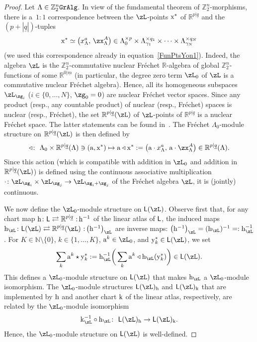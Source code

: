 \documentclass[pdftex]{sigma}%
\newcommand{\catname}[1]{\textnormal{\texttt{#1}}}
\newcommand{\R}{{\mathbb R}}
\newcommand{\Z}{{\mathbb Z}}
\def\ul{\underline}
\def\ul{\underline}
\newcommand{\0}{\otimes}
\newcommand{\z}{\Z_2^n}
\numberwithin{equation}{section}
\begin{document}
\begin{proof}
Let $\Lambda \in \Z_2^n\catname{GrAlg}$. In view of the fundamental theorem of $\z$-morphisms, there is a~$1:1$ correspondence between the $\zL$-points $\rm{x}^*$ of $\R^{p|\ul{q}}$ and the $(p+|\ul{q}|)$-tuples
%
\[
\mathrm{x}^* \simeq \big( {x}^a_\Lambda , \, \zx^A_\Lambda\big)\in {\Lambda}_{0}^{\times p} \times \Lambda_{\gamma_1}^{\times q_1} \times \dots \times \Lambda_{\gamma_N}^{\times q_N}
\]
%
(we used this correspondence already in equation~\eqref{FunPtsYon1}). Indeed, the algebra $\zL$ is the $\Z_2^n$-commutative nuclear Fr\'echet $\R$-algebra of global $\Z_2^n$-functions of some $\R^{0|\ul{m}}$ (in particular, the degree zero term $\zL_0$ of $\zL$ is a commutative nuclear Fr\'echet algebra). Hence, all its homogeneous subspaces $\zL_{\zg_i}$ ($i\in\{0,\dots, N\}$, $\zg_0=0$) are nuclear Fr\'echet vector spaces. Since any product (resp., any countable product) of nuclear (resp., Fr\'echet) spaces is nuclear (resp., Fr\'echet), the set $\R^{p|\ul{q}}(\zL)$ of $\zL$-points of $\R^{p|\ul{q}}$ is a nuclear Fr\'echet space. The latter statements can be found in~\cite{Bruce:2018}. The Fr\'{e}chet $\Lambda_{0}$-module structure on $\R^{p|\ul{q}}(\zL)$ is then defined by
\begin{gather}\label{ActionCompWise}
 \triangleleft\colon\ \Lambda_{0} \times \R^{p|\ul{q}}(\Lambda)\ni (\mathrm{a}, \mathrm{x}^*)\mapsto {\rm a}\triangleleft{\rm x}^*:=\big(\mathrm{a} \cdot x_\Lambda^a, \, \mathrm{a} \cdot \zx_\Lambda^{A} \big)\in\R^{p|\ul{q}}(\Lambda) .
\end{gather}
Since this action (which is compatible with addition in $\zL_0$ and addition in $\R^{p|\ul q}(\zL)$) is defined using the continuous associative multiplication $\cdot\colon \zL_{\zg_i}\times\zL_{\zg_j}\to\zL_{\zg_i+\zg_j}$ of the Fr\'echet algebra $\zL$, it is (jointly) continuous.

We now define the $\zL_0$-module structure on ${\sf L}(\zL)$. Observe first that, for any chart map ${\rm h}\colon {\sf L}\rightleftarrows\R^{p|\ul q}\ {:}\, {\rm h}^{-1}$ of the linear atlas of $\sf L$, the induced maps ${\rm h}_\zL\colon {\sf L}(\zL)\rightleftarrows\R^{p|\ul q}(\zL)\ {:}\,\big({\rm h}^{-1}\big)_\zL$ are inverse maps: $\big({\rm h}^{-1}\big)_\zL=({\rm h}_\zL)^{-1}=:{\rm h}^{-1}_\zL$. For $K\in\mathbb{N}\setminus\{0\}$, $k\in\{1,\dots,K\}$, ${\rm a}^k\in\zL_0$, and ${\rm y}_k^*\in{\sf L}(\zL)$, we set
\[
\sum_k {\rm a}^k\star {\rm y}_k^*:={\rm h}_\zL^{-1}\bigg(\sum_k {\rm a}^k\triangleleft{\rm h}_\zL({\rm y}_k^*)\bigg)\in{\sf L}(\zL).
\]
This defines a $\zL_0$-module structure on ${\sf L}(\zL)$ that makes ${\rm h}_\zL$ a $\zL_0$-module isomorphism. The $\zL_0$-module structures ${\sf L}(\zL)_{\rm h}$ and ${\sf L}(\zL)_{\rm k}$ that are implemented by $\rm h$ and another chart $\rm k$ of the linear atlas, respectively, are related by the $\zL_0$-module isomorphism
\[
{\rm k}_\zL^{-1}\circ {\rm h}_\zL\colon\ {\sf L}(\zL)_{\rm h}\to {\sf L}(\zL)_{\rm k}.
\]
Hence, the $\zL_0$-module structure on ${\sf L}(\zL)$ is well-defined.


\end{proof}
\end{document}
